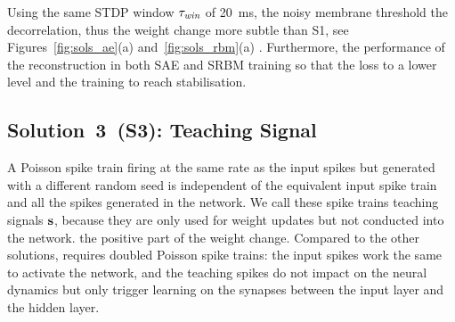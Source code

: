 Using the same STDP window $\tau_{\textit{\textrm{win}}}$ of 20~ms, the noisy membrane threshold \DIFdelbegin {}\DIFdelend \DIFaddbegin {}\DIFaddend the decorrelation, thus the weight change \DIFdelbegin {}\DIFdelend \DIFaddbegin {}\DIFaddend more subtle than S1, see Figures~\ref{fig:sols_ae}(a) and~\ref{fig:sols_rbm}(a) .
Furthermore, the performance of the reconstruction \DIFdelbegin {}\DIFdelend \DIFaddbegin {}\DIFaddend in both SAE and SRBM training so that the loss \DIFdelbegin {}\DIFdelend \DIFaddbegin {}\DIFaddend to a lower level and the training \DIFdelbegin {}\DIFdelend \DIFaddbegin {}\DIFaddend to reach stabilisation. %


\subsection{Solution~3~(S3): Teaching Signal}
A Poisson spike train firing at the same rate as the input spikes but generated with a different random seed is independent of the equivalent input spike train and all the spikes generated in the network.
We call these spike trains teaching signals $\bf{s}$, because they are only used for weight updates but not conducted into the network.
\DIFdelbegin {}\DIFdelend %
\DIFaddbegin {}\DIFaddend the positive part of the weight change\DIFdelbegin {}\DIFdelend \DIFaddbegin {}\DIFaddend .  
Compared to the other solutions, \DIFdelbegin {}\DIFdelend \DIFaddbegin {}\DIFaddend requires doubled Poisson spike trains: the input spikes work the same to activate the network, and the teaching spikes do not impact on the neural dynamics but only trigger learning on the synapses between the input layer and the hidden layer.

